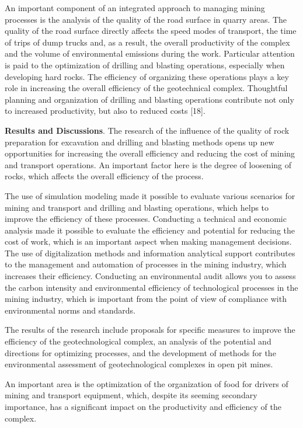 \begin{multicols}{2}
An important component of an integrated approach to managing mining
processes is the analysis of the quality of the road surface in quarry
areas. The quality of the road surface directly affects the speed modes
of transport, the time of trips of dump trucks and, as a result, the
overall productivity of the complex and the volume of environmental
emissions during the work. Particular attention is paid to the
optimization of drilling and blasting operations, especially when
developing hard rocks. The efficiency of organizing these operations
plays a key role in increasing the overall efficiency of the
geotechnical complex. Thoughtful planning and organization of drilling
and blasting operations contribute not only to increased productivity,
but also to reduced costs {[}18{]}.

{\bfseries Results and Discussions}. The research of the influence of the
quality of rock preparation for excavation and drilling and blasting
methods opens up new opportunities for increasing the overall efficiency
and reducing the cost of mining and transport operations. An important
factor here is the degree of loosening of rocks, which affects the
overall efficiency of the process.

The use of simulation modeling made it possible to evaluate various
scenarios for mining and transport and drilling and blasting operations,
which helps to improve the efficiency of these processes. Conducting a
technical and economic analysis made it possible to evaluate the
efficiency and potential for reducing the cost of work, which is an
important aspect when making management decisions. The use of
digitalization methods and information analytical support contributes to
the management and automation of processes in the mining industry, which
increases their efficiency. Conducting an environmental audit allows you
to assess the carbon intensity and environmental efficiency of
technological processes in the mining industry, which is important from
the point of view of compliance with environmental norms and standards.

The results of the research include proposals for specific measures to
improve the efficiency of the geotechnological complex, an analysis of
the potential and directions for optimizing processes, and the
development of methods for the environmental assessment of
geotechnological complexes in open pit mines.

An important area is the optimization of the organization of food for
drivers of mining and transport equipment, which, despite its seeming
secondary importance, has a significant impact on the productivity and
efficiency of the complex.


\end{multicols}
